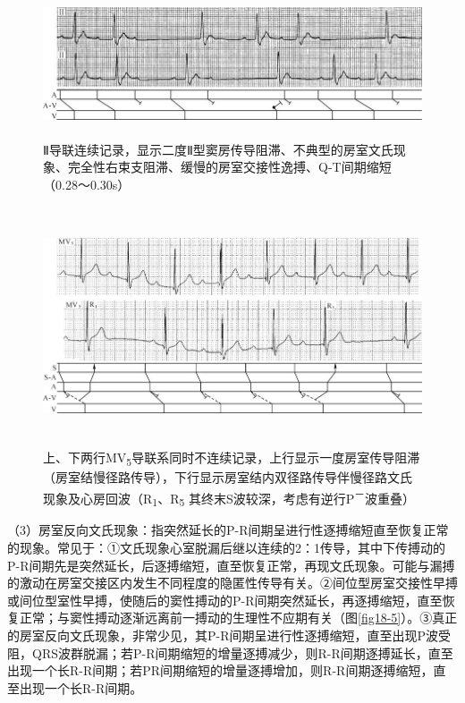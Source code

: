 \begin{figure}[!htbp]
 \centering
 \includegraphics[width=5.80208in,height=1.70833in]{./images/Image00304.jpg}
 \captionsetup{justification=centering}
 \caption{Ⅱ导联连续记录，显示二度Ⅱ型窦房传导阻滞、不典型的房室文氏现象、完全性右束支阻滞、缓慢的房室交接性逸搏、Q-T间期缩短（0.28～0.30s）}
 \label{fig18-3}
  \end{figure} 

\begin{figure}[!htbp]
 \centering
 \includegraphics[width=6.02083in,height=2.78125in]{./images/Image00305.jpg}
 \captionsetup{justification=centering}
 \caption{上、下两行MV\textsubscript{5}导联系同时不连续记录，上行显示一度房室传导阻滞（房室结慢径路传导），下行显示房室结内双径路传导伴慢径路文氏现象及心房回波（R\textsubscript{1}、R\textsubscript{5} 其终末S波较深，考虑有逆行P\textsuperscript{－}波重叠）}
 \label{fig18-4}
  \end{figure} 


（3）房室反向文氏现象：指突然延长的P-R间期呈进行性逐搏缩短直至恢复正常的现象。常见于：①文氏现象心室脱漏后继以连续的2：1传导，其中下传搏动的P-R间期先是突然延长，后逐搏缩短，直至恢复正常，再现文氏现象。可能与漏搏的激动在房室交接区内发生不同程度的隐匿性传导有关。②间位型房室交接性早搏或间位型室性早搏，使随后的窦性搏动的P-R间期突然延长，再逐搏缩短，直至恢复正常；与窦性搏动逐渐远离前一搏动的生理性不应期有关（图\ref{fig18-5}）。③真正的房室反向文氏现象，非常少见，其P-R间期呈进行性逐搏缩短，直至出现P波受阻，QRS波群脱漏；若P-R间期缩短的增量逐搏减少，则R-R间期逐搏延长，直至出现一个长R-R间期；若PR间期缩短的增量逐搏增加，则R-R间期逐搏缩短，直至出现一个长R-R间期。

